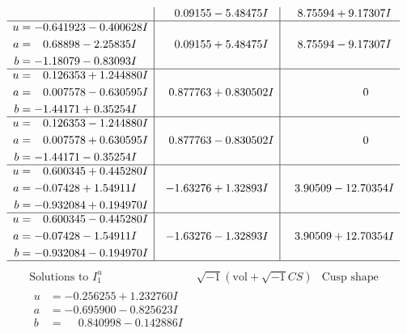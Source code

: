 \documentclass[1p]{elsarticle_modified}
\theoremstyle{definition}
\newcommand{\I}{\sqrt{-1}}
\begin{document}
$$\begin{array}{c|c|c}
 & \phantom{-}0.09155 - 5.48475 I & \phantom{-}8.75594 + 9.17307 I \\ \hline\begin{aligned}
u &= -0.641923 - 0.400628 I \\
a &= \phantom{-}0.68898 - 2.25835 I \\
b &= -1.18079 - 0.83093 I\end{aligned}
 & \phantom{-}0.09155 + 5.48475 I & \phantom{-}8.75594 - 9.17307 I \\ \hline\begin{aligned}
u &= \phantom{-}0.126353 + 1.244880 I \\
a &= \phantom{-}0.007578 - 0.630595 I \\
b &= -1.44171 + 0.35254 I\end{aligned}
 & \phantom{-}0.877763 + 0.830502 I & \phantom{-0.000000 } 0 \\ \hline\begin{aligned}
u &= \phantom{-}0.126353 - 1.244880 I \\
a &= \phantom{-}0.007578 + 0.630595 I \\
b &= -1.44171 - 0.35254 I\end{aligned}
 & \phantom{-}0.877763 - 0.830502 I & \phantom{-0.000000 } 0 \\ \hline\begin{aligned}
u &= \phantom{-}0.600345 + 0.445280 I \\
a &= -0.07428 + 1.54911 I \\
b &= -0.932084 + 0.194970 I\end{aligned}
 & -1.63276 + 1.32893 I & \phantom{-}3.90509 - 12.70354 I \\ \hline\begin{aligned}
u &= \phantom{-}0.600345 - 0.445280 I \\
a &= -0.07428 - 1.54911 I \\
b &= -0.932084 - 0.194970 I\end{aligned}
 & -1.63276 - 1.32893 I & \phantom{-}3.90509 + 12.70354 I\\
 \hline 
 \end{array}$$\newpage$$\begin{array}{c|c|c}  
\text{Solutions to }I^u_{1}& \I (\text{vol} + \sqrt{-1}CS) & \text{Cusp shape}\\
 \hline 
\begin{aligned}
u &= -0.256255 + 1.232760 I \\
a &= -0.695900 - 0.825623 I \\
b &= \phantom{-}0.840998 - 0.142886 I\end{aligned}

\end{array}$$
\end{document}
